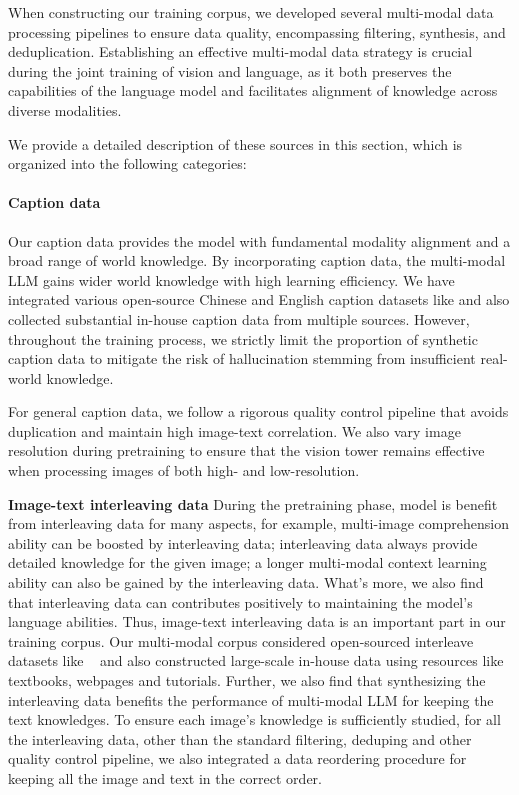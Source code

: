 \documentclass{article}
\newcommand{\citep}[1]{\parencite{#1}}
\begin{document}
When constructing our training corpus, we developed several multi-modal data processing pipelines to ensure data quality, encompassing filtering, synthesis, and deduplication. 
Establishing an effective multi-modal data strategy is crucial during the joint training of vision and language, as it both preserves the capabilities of the language model and facilitates alignment of knowledge across diverse modalities.

We provide a detailed description of these sources in this section, which is organized into the following categories:

\paragraph{Caption data}
Our caption data provides the model with fundamental modality alignment and a broad range of world knowledge. By incorporating caption data, the multi-modal LLM gains wider world knowledge with high learning efficiency. We have integrated various open-source Chinese and English caption datasets like \citep{schuhmann2022laion, gadre2024datacomp} and also collected substantial in-house caption data from multiple sources. However, throughout the training process, we strictly limit the proportion of synthetic caption data to mitigate the risk of hallucination stemming from insufficient real-world knowledge.

For general caption data, we follow a rigorous quality control pipeline that avoids duplication and maintain high image-text correlation. We also vary image resolution during pretraining to ensure that the vision tower remains effective when processing images of both high- and low-resolution.


\textbf{Image-text interleaving data}
During the pretraining phase, model is benefit from interleaving data for many aspects, for example, multi-image comprehension ability can be boosted by interleaving data; interleaving data always provide detailed knowledge for the given image; a longer multi-modal context learning ability can also be gained by the interleaving data. What's more, we also find that interleaving data can contributes positively to maintaining the model’s language abilities. 
Thus, image-text interleaving data is an important part in our training corpus. 
Our multi-modal corpus considered open-sourced interleave datasets like ~\citep{zhu2024multimodal,laurenccon2024obelics} and also constructed large-scale in-house data using resources like textbooks, webpages and tutorials.
Further, we also find that synthesizing the interleaving data benefits the performance of multi-modal LLM for keeping the text knowledges.  
To ensure each image's knowledge is sufficiently studied, for all the interleaving data, other than the standard filtering, deduping and other quality control pipeline, we also integrated a data reordering procedure for keeping all the image and text in the correct order.  
 
\end{document}
